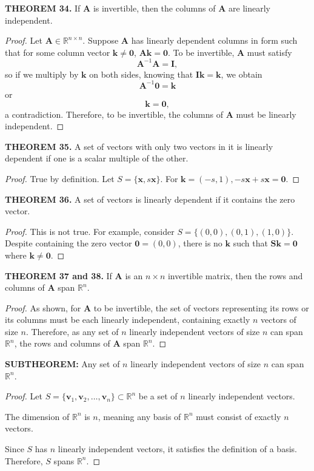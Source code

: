 \documentclass[12pt]{article}
\newcommand{\mat}[1]{\mathbf{#1}}
\newcommand{\theorem}[2]{\textbf{THEOREM #1.} #2}
\newcommand{\subtheorem}[1]{\textbf{SUBTHEOREM:} #1}
\begin{document}
\theorem{34}{If $\mat{A}$ is invertible, then the columns of $\mat{A}$ are linearly independent.}

\begin{proof}
Let $\mat{A} \in \mathbb{R}^{n \times n}$. Suppose $\mat{A}$ has linearly dependent columns in form such that for some column vector $\mat{k} \neq \mat{0}$, $\mat{Ak} = \mat{0}$. To be invertible, $\mat{A}$ must satisfy
$$\mat{A}^{-1}\mat{A} = \mat{I},$$
so if we multiply by $\mat{k}$ on both sides, knowing that $\mat{Ik}=\mat{k}$, we obtain
$$\mat{A}^{-1} \mat{0} = \mat{k}$$
or
$$\mat{k} = \mat{0},$$
a contradiction. Therefore, to be invertible, the columns of $\mat{A}$ must be linearly independent.
\end{proof}

\theorem{35}{A set of vectors with only two vectors in it is linearly dependent if one is a scalar multiple of the other.}

\begin{proof}
True by definition. Let $S = \{ \mat{x}, s\mat{x} \}$. For $\mat{k} = ( -s, 1 ), -s\mat{x}+s\mat{x} = \mat{0}$.
\end{proof}

\theorem{36}{A set of vectors is linearly dependent if it contains the zero vector.}

\begin{proof}
This is not true. For example, consider $S=\{ (0,0), (0,1), (1,0) \}$. Despite containing the zero vector $\mat{0}=(0,0)$, there is no $\mat{k}$ such that $\mat{Sk=0}$ where $\mat{k} \ne \mat{0}$.
\end{proof}

\theorem{37 and 38}{If $\mat{A}$ is an $n \times n$ invertible matrix, then the rows and columns of $\mat{A}$ span $\mathbb{R}^{n}$.}

\begin{proof}
As shown, for $\mat{A}$ to be invertible, the set of vectors representing its rows or its columns must be each linearly independent, containing exactly $n$ vectors of size $n$. Therefore, as any set of $n$ linearly independent vectors of size $n$ can span $\mathbb{R}^{n}$, the rows and columns of $\mat{A}$ span $\mathbb{R}^{n}$.    
\end{proof}

\subtheorem{Any set of $n$ linearly independent vectors of size $n$ can span $\mathbb{R}^{n}$.}

\begin{proof}
Let $S = \{ \mat{v}_1, \mat{v}_2, \ldots, \mat{v}_n \} \subset \mathbb{R}^n$ be a set of $n$ linearly independent vectors.

The dimension of $\mathbb{R}^n$ is $n$, meaning any basis of $\mathbb{R}^n$ must consist of exactly $n$ vectors.

Since $S$ has $n$ linearly independent vectors, it satisfies the definition of a basis. Therefore, $S$ spans $\mathbb{R}^n$.
\end{proof}
\end{document}
